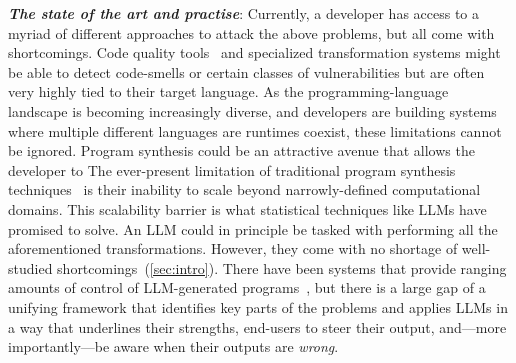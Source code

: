 \documentclass[sigplan,review,anonymous,10pt]{acmart}
\newcommand{\heading}[1]{\vspace{2pt}\noindent\textbf{\emph{#1}}:\enspace}
\begin{document}
\heading{The state of the art and practise}
Currently, a developer has access to a myriad of different approaches 
to attack the above problems, but all come with shortcomings.
Code quality tools~\cite{avgustinov2016ql, Fowler99,Mens04,Myers16} and specialized transformation systems might be able to detect 
code-smells or certain classes of vulnerabilities but are often very highly 
tied to their target language.
As the programming-language landscape is becoming increasingly diverse,
and developers are building systems where multiple different languages are runtimes coexist,
these limitations cannot be ignored.
Program synthesis could be an attractive avenue that allows 
the developer to 
The ever-present limitation of traditional program synthesis techniques~\cite{jha2010oracle, raza2018disjunctive, singh2016blinkfill,wu2023programming, harp:ccs:2021, yaghmazadeh2018automated} is their 
inability to scale beyond narrowly-defined computational domains.
This scalability barrier is what statistical techniques like LLMs 
have promised to solve.
An LLM could in principle be tasked with performing all the aforementioned transformations.
However, they come with no shortage of well-studied shortcomings~(\cref{sec:intro}).
There have been systems that provide ranging amounts of control of LLM-generated 
programs~\cite{huang2023anplnaturalprogramminginteractive,li2025mccoderstreamliningmotioncontrol,barua2025pygencollaborativehumanaiapproach, tihanyi2025new},
but there is a large gap of a unifying framework that identifies 
key parts of the problems and applies LLMs in a way that underlines their strengths,
end-users to steer their output, and---more importantly---be aware when 
their outputs are \emph{wrong}.


\end{document}

